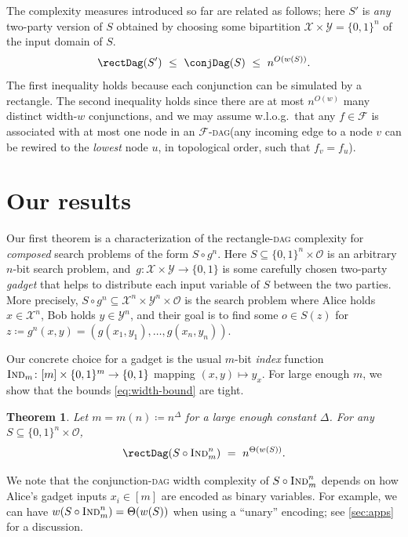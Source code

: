 \documentclass[11pt]{article}
\numberwithin{equation}{section}
\newtheorem{theorem}{Theorem}[section]
\theoremstyle{definition}
\theoremstyle{plain}
\newcommand{\Ind}{\textsc{Ind}}
\newcommand{\DAGspace}{\textsc{dag}\xspace}
\newcommand{\calO}{\mathcal{O}}
\newcommand{\calF}{\mathcal{F}}
\newcommand{\calX}{\mathcal{X}}
\newcommand{\calY}{\mathcal{Y}}
\begin{document}
\bigskip\noindent
The complexity measures introduced so far are related as follows; here $S'$ is \emph{any} two-party version of $S$ obtained by choosing some bipartition $\calX\times\calY=\{0,1\}^n$ of the 
input domain of $S$. %
\begin{equation} \label{eq:width-bound}
\rectDag(S')~\leq~\conjDag(S)~\leq~n^{O(w(S))}.
\end{equation}
The first inequality holds because each conjunction can be simulated by a rectangle. The second inequality holds since there are at most $n^{O(w)}$ many distinct width-$w$ conjunctions, and we may assume w.l.o.g.\ that any $f\in\calF$ is associated with at most one node in an $\calF$-\DAGspace (any incoming edge to a node $v$ can be rewired to the \emph{lowest} node $u$, in topological order, such that $f_v=f_u$).

\section{Our results} \label{sec:results}

Our first theorem is a characterization of the rectangle-\DAGspace complexity for \emph{composed} search problems of the form $S\circ g^n$. Here $S\subseteq\{0,1\}^n\times\calO$ is an arbitrary $n$-bit search problem, and~$g\colon\calX\times\calY\to\{0,1\}$ is some carefully chosen two-party \emph{gadget} that helps to distribute each input variable of $S$ between the two parties. More precisely, $S\circ g^n\subseteq \calX^n\times\calY^n\times\calO$ is the search problem where Alice holds $x\in\calX^n$, Bob holds $y\in\calY^n$, and their goal is to find some $o\in S(z)$ for $z\coloneqq g^n(x,y)=(g(x_1,y_1),\ldots,g(x_n,y_n))$.

Our concrete choice for a gadget is the usual $m$-bit \emph{index} function $\Ind_m\colon[m]\times\{0,1\}^m\to\{0,1\}$ mapping $(x,y)\mapsto y_x$. For large enough $m$, we show that the bounds \eqref{eq:width-bound} are tight.
\begin{theorem} \label{thm:main}
Let $m=m(n)\coloneqq n^\Delta$ for a large enough constant $\Delta$. For any $S\subseteq\{0,1\}^n\times \calO$,
\[
\rectDag(S\circ \Ind_m^n)~=~
n^{\Theta(w(S))}.
\]
\end{theorem}
We note that the conjunction-\DAGspace width complexity of $S\circ\Ind_m^n$ depends on how Alice's gadget inputs $x_i\in [m]$ are encoded as binary variables. For example, we can have $w(S\circ\Ind_m^n)=\Theta(w(S))$ when using a ``unary'' encoding; see \autoref{sec:apps} for a discussion. 
\end{document}
